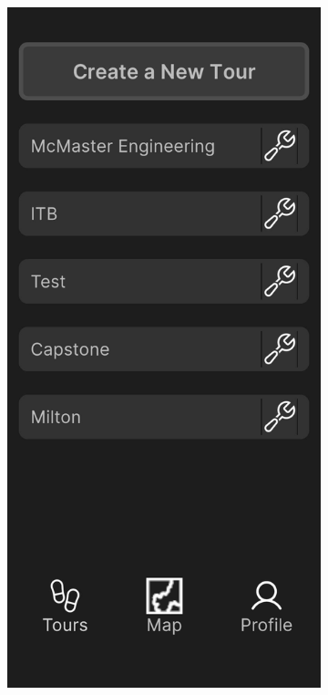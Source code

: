 \documentclass[12pt, titlepage]{article}
\begin{document}
\newpage
\begin{figure}[ht!]
    \centering
    \begin{subfigure}[b]{0.48\textwidth}
        \centering
        \includegraphics[width=\textwidth]{tour_screen.png}

\end{subfigure}
\end{figure}
\end{document}
